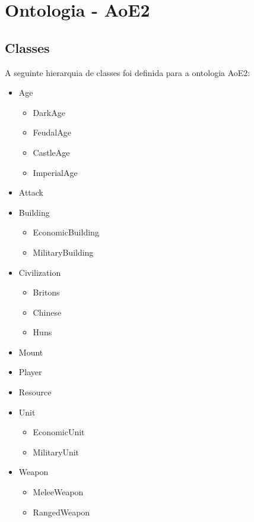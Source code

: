 \documentclass[10pt,a4paper]{article}
\begin{document}
\section{Ontologia - AoE2}

\subsection{Classes}

A seguinte hierarquia de classes foi definida para a ontologia AoE2:
%
\begin{itemize}
    \item Age
        \begin{itemize}
            \item DarkAge
            \item FeudalAge
            \item CastleAge
            \item ImperialAge
        \end{itemize}
    \item Attack
    \item Building
        \begin{itemize}
            \item EconomicBuilding
            \item MilitaryBuilding
        \end{itemize}
    \item Civilization
        \begin{itemize}
            \item Britons
            \item Chinese
            \item Huns
        \end{itemize}
    \item Mount
    \item Player
    \item Resource
    \item Unit
        \begin{itemize}
            \item EconomicUnit
            \item MilitaryUnit
        \end{itemize}
    \item Weapon
        \begin{itemize}
            \item MeleeWeapon
            \item RangedWeapon
        \end{itemize}
\end{itemize}
% 
\end{document}
